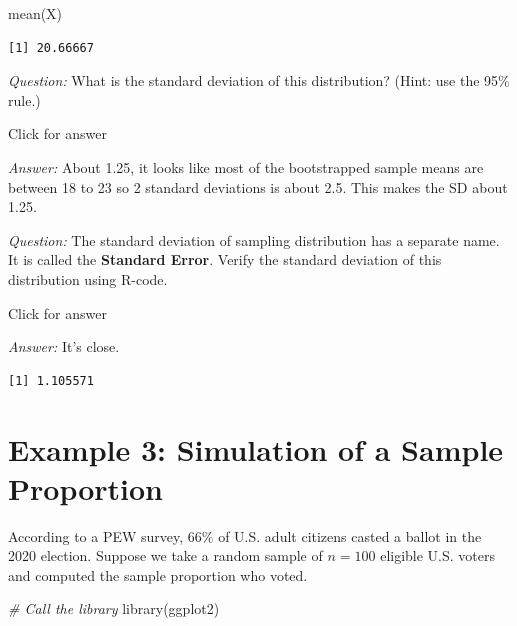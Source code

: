 \documentclass[
]{book}
\newenvironment{Shaded}{\begin{snugshade}}{\end{snugshade}}
\newcommand{\CommentTok}[1]{\textcolor[rgb]{0.56,0.35,0.01}{\textit{#1}}}
\newcommand{\FunctionTok}[1]{\textcolor[rgb]{0.00,0.00,0.00}{#1}}
\newcommand{\NormalTok}[1]{#1}
\newcommand{\SpecialCharTok}[1]{\textcolor[rgb]{0.00,0.00,0.00}{#1}}
\begin{document}
\begin{Shaded}
\begin{Highlighting}[]
\FunctionTok{mean}\NormalTok{(X)}
\end{Highlighting}
\end{Shaded}

\begin{verbatim}
[1] 20.66667
\end{verbatim}

\emph{Question:} What is the standard deviation of this distribution? (Hint: use the 95\% rule.)

Click for answer

\emph{Answer:} About 1.25, it looks like most of the bootstrapped sample means are between 18 to 23 so 2 standard deviations is about 2.5. This makes the SD about 1.25.

\emph{Question:} The standard deviation of sampling distribution has a separate name. It is called the \textbf{Standard Error}. Verify the standard deviation of this distribution using R-code.

Click for answer

\emph{Answer:} It's close.

\begin{Shaded}
\end{Shaded}

\begin{verbatim}
[1] 1.105571
\end{verbatim}

\hypertarget{example-3-simulation-of-a-sample-proportion}{%
\section{Example 3: Simulation of a Sample Proportion}\label{example-3-simulation-of-a-sample-proportion}}

According to a PEW survey, \(66\%\) of U.S. adult citizens casted a ballot in the 2020 election. Suppose we take a random sample of \(n=100\) eligible U.S. voters and computed the sample proportion who voted.

\begin{Shaded}
\begin{Highlighting}[]
\CommentTok{\# Call the library}
\FunctionTok{library}\NormalTok{(ggplot2)}
\end{Highlighting}
\end{Shaded}
\end{document}
